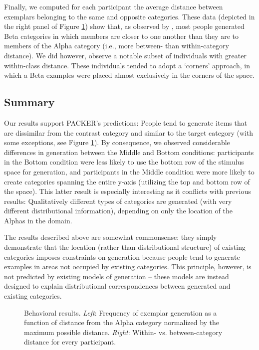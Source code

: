 \documentclass[10pt,letterpaper]{article}
\newcommand\inputpgf[2]{{
\let\pgfimageWithoutPath\pgfimage
\renewcommand{\pgfimage}[2][]{\pgfimageWithoutPath[##1]{#1/##2}}

}}
\begin{document}
Finally, we computed for each participant the average distance between exemplars belonging to the same and opposite categories. These data (depicted in the right panel of Figure \ref{fig:distance.figs}) show that, as observed by \citet{ward1994structured}, most people generated Beta categories in which members are closer to one another than they are to members of the Alpha category (i.e., more between- than within-category distance). We did however, observe a notable subset of individuals with greater within-class distance. These individuals tended to adopt a `corners' approach, in which a Beta examples were placed almost exclusively in the corners of the space.


\subsection{Summary}

Our results support PACKER's predictions: People tend to generate items that are dissimilar from the contrast category and similar to the target category (with some exceptions, see Figure \ref{fig:distance.figs}). By consequence, we observed considerable differences in generation between the Middle and Bottom conditions: participants in the Bottom condition were less likely to use the bottom row of the stimulus space for generation, and participants in the Middle condition were more likely to create categories spanning the entire y-axis (utilizing the top and bottom row of the space). This latter result is especially interesting as it conflicts with previous results: Qualitatively different types of categories are generated (with very different distributional information), depending on only the location of the Alphas in the domain. 

The results described above are somewhat commonsense: they simply demonstrate that the location (rather than distributional structure) of existing categories imposes constraints on generation because people tend to generate examples in areas not occupied by existing categories. This principle, however, is not predicted by existing models of generation -- these models are instead designed to explain distributional correspondences between generated and existing categories.  

\begin{figure}
    \begin{center}
    \inputpgf{figs/}{distance.figs.pgf}
    \caption{Behavioral results. \textit{Left}: Frequency of exemplar generation as a function of distance from the Alpha category normalized by the maximum possible distance. \textit{Right}: Within- vs. between-category distance for every participant. }
    \label{fig:distance.figs}
    \end{center}
\end{figure}
\end{document}
